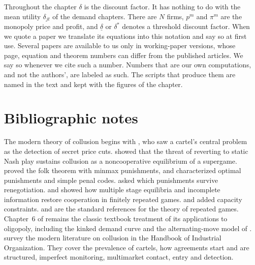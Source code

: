 Throughout the chapter $\delta$ is the discount factor. It has nothing to do with the mean utility $\delta_{jt}$ of
the demand chapters. There are $N$ firms, $p^m$ and $\pi^m$ are the monopoly price and profit, and
$\underline\delta$ or $\delta^*$ denotes a threshold discount factor. When we quote a paper we translate its
equations into this notation and say so at first use. Several papers are available to us only in working-paper
versions, whose page, equation and theorem numbers can differ from the published articles. We say so whenever we
cite such a number. Numbers that are our own computations, and not the authors', are labeled as such. The scripts
that produce them are named in the text and kept with the figures of the chapter.







\section{Bibliographic notes}\label{sec:12-bibnotes}

The modern theory of collusion begins with \citet{Stigler1964}, who saw a cartel's central problem as the
detection of secret price cuts. \citet{Friedman1971} showed that the threat of reverting to static Nash play
sustains collusion as a noncooperative equilibrium of a supergame. \citet{FudenbergMaskin1986} proved the folk
theorem with minmax punishments, and \citet{Abreu1986,Abreu1988} characterized optimal punishments and simple
penal codes. \citet{FarrellMaskin1989} asked which punishments survive renegotiation. \citet{BenoitKrishna1985}
and \citet{KrepsEtAl1982} showed how multiple stage equilibria and incomplete information restore cooperation in
finitely repeated games. \citet{BrockScheinkman1985} and \citet{CompteJennyRey2002} added capacity constraints.
\citet{FudenbergTirole1991} and \citet{MailathSamuelson2006} are the standard references for the theory of repeated
games. Chapter~6 of \citet{Tirole1988} remains the classic textbook treatment of its applications to oligopoly,
including the kinked demand curve and the alternating-move model of \citet{MaskinTirole1988}.
\citet{AskerNocke2021} survey the modern literature on collusion in the Handbook of Industrial Organization. They
cover the prevalence of cartels, how agreements start and are structured, imperfect monitoring, multimarket contact,
entry and detection.

